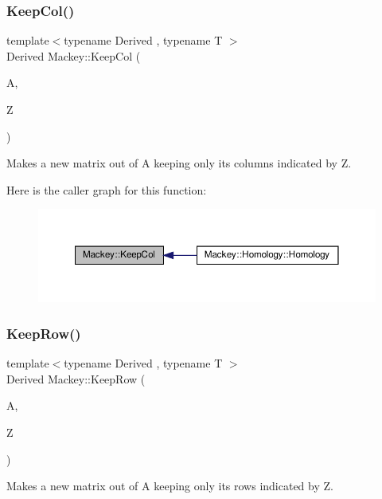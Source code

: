 \subsubsection{\texorpdfstring{Keep\+Col()}{KeepCol()}}
{\footnotesize\ttfamily template$<$typename Derived , typename T $>$ \\
Derived Mackey\+::\+Keep\+Col (\begin{DoxyParamCaption}\item[{const Eigen\+::\+Dense\+Base$<$ Derived $>$ \&}]{A,  }\item[{const std\+::vector$<$ T $>$ \&}]{Z }\end{DoxyParamCaption})}



Makes a new matrix out of A keeping only its columns indicated by Z. 

Here is the caller graph for this function\+:\nopagebreak
\begin{figure}[H]
\begin{center}
\leavevmode
\includegraphics[width=350pt]{namespaceMackey_a782d9ce52543c3ae3520b4859dda3240_icgraph}
\end{center}
\end{figure}
\mbox{\label{namespaceMackey_ae44b27dcf905a7ff976ebc79f197c579}} 
\subsubsection{\texorpdfstring{Keep\+Row()}{KeepRow()}}
{\footnotesize\ttfamily template$<$typename Derived , typename T $>$ \\
Derived Mackey\+::\+Keep\+Row (\begin{DoxyParamCaption}\item[{const Eigen\+::\+Dense\+Base$<$ Derived $>$ \&}]{A,  }\item[{const std\+::vector$<$ T $>$ \&}]{Z }\end{DoxyParamCaption})}



Makes a new matrix out of A keeping only its rows indicated by Z. 


